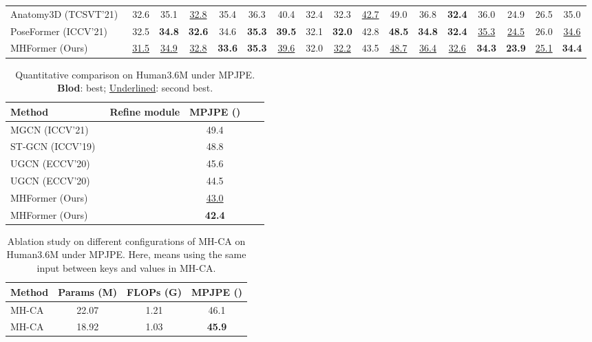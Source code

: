 \documentclass[10pt,twocolumn,letterpaper]{article}
\newcommand{\cmark}{\ding{51}}
\def\VspaceL{\vspace{-0.40cm}}
\def\VspaceS{\vspace{-0.30cm}}
\begin{document}
\begin{table*}[htb]
{\begin{tabular}{@{}l|ccccccccccccccc|c@{}}
Anatomy3D (TCSVT'21)~\cite{chen2021anatomy}  &32.6 &{35.1} &\underline{32.8} &35.4 &36.3 &{40.4} &32.4 &{32.3} &\underline{42.7} &{49.0} &36.8 &\textbf{32.4} &36.0 &24.9 &26.5 &35.0 \\

PoseFormer (ICCV'21)~\cite{poseformer}  &32.5 &\textbf{34.8} &\textbf{32.6} &34.6 &\textbf{35.3} &\textbf{39.5} &{32.1} &\textbf{32.0} &42.8 &\textbf{48.5} &\textbf{34.8} &\textbf{32.4} &\underline{35.3} &\underline{24.5} &26.0 &\underline{34.6} \\

\midrule[0.5pt]
MHFormer (Ours)  &\underline{31.5} &\underline{34.9} &\underline{32.8} &\textbf{33.6} &\textbf{35.3} &\underline{39.6} &{32.0} &\underline{32.2} &{43.5} &\underline{48.7} &\underline{36.4} &\underline{32.6} &\textbf{34.3} &\textbf{23.9} &\underline{25.1} &\textbf{34.4} \\

\toprule[1pt]
\end{tabular}
}
\VspaceS
\label{table:h36m}
\end{table*} 

\begin{table}
   \footnotesize
   \centering
   \caption
   {
     Quantitative comparison on Human3.6M under MPJPE. 
     \textbf{Blod}: best; 
     \underline{Underlined}: second best. 
   }
   \setlength{\tabcolsep}{4.40mm} 
   \begin{tabular}{@{}lcccc@{}}
   \toprule
   Method &Refine module &MPJPE () \\
   \midrule
   MGCN (ICCV'21)~\cite{zou2021modulated} &\cmark &49.4 \\
   ST-GCN (ICCV'19)~\cite{cai2019exploiting} &\cmark &48.8 \\
   UGCN (ECCV'20)~\cite{wang2020motion} & &45.6 \\
   UGCN (ECCV'20)~\cite{wang2020motion} &\cmark &44.5 \\
   \midrule
   MHFormer (Ours) & &\underline{43.0} \\
   MHFormer (Ours) &\cmark &\textbf{42.4} \\
   \bottomrule
   \end{tabular}
   \VspaceS
   \label{table:refine}
\end{table}

\begin{table}[tb]
   \centering  
   \footnotesize
   \caption
   {
     Ablation study on different configurations of MH-CA on Human3.6M under MPJPE. 
     Here,  means using the same input between keys and values in MH-CA. 
   }
   \setlength{\tabcolsep}{3.55mm}  
   \begin{tabular}{lccc}
     \toprule [1pt]
     Method &Params (M) &FLOPs (G) &MPJPE () \\
     \midrule [0.5pt]
     MH-CA  &22.07 &1.21 &46.1 \\
     MH-CA &18.92 &1.03 &\textbf{45.9} \\
     \toprule [1pt]
   \end{tabular}
   \VspaceL
   \label{table:MHCA}
\end{table}
 
\end{document}
